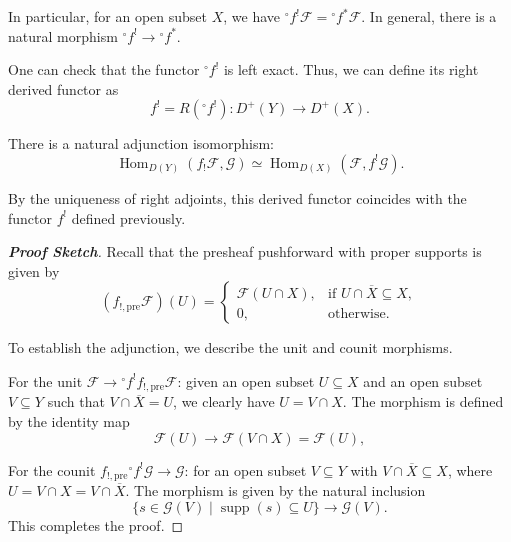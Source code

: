 In particular, for an open subset $X$, we have $^\circ f^! \mathcal{F} ={}^\circ f^* \mathcal{F}$. In general, there is a natural morphism $^\circ f^! \longrightarrow {}^\circ f^*$. 

One can check that the functor $^\circ f^!$ is left exact. Thus, we can define its right derived functor as
\begin{equation*}
    f^! = R(^\circ f^!) \colon D^+(Y) \longrightarrow D^+(X).
\end{equation*}

\begin{proposition}
There is a natural adjunction isomorphism:
\begin{equation*}
    \operatorname{Hom}_{D(Y)}(f_! \mathcal{F}, \mathcal{G}) \simeq \operatorname{Hom}_{D(X)}(\mathcal{F}, f^! \mathcal{G}).
\end{equation*}
\end{proposition}

\begin{remark}
By the uniqueness of right adjoints, this derived functor coincides with the functor $f^!$ defined previously.
\end{remark}

\begin{proof}[\textbf{Proof Sketch}]
Recall that the presheaf pushforward with proper supports is given by
\begin{equation*}
    (f_{!,\text{pre}}\mathcal{F})(U) = 
    \begin{cases} 
        \mathcal{F}(U \cap X), & \text{if } U \cap \overline{X} \subseteq X, \\
        0, & \text{otherwise}.
    \end{cases}
\end{equation*}

To establish the adjunction, we describe the unit and counit morphisms.

For the unit $\mathcal{F} \longrightarrow {}^\circ f^! f_{!,\text{pre}} \mathcal{F}$: 
given an open subset $U \subseteq X$ and an open subset $V \subseteq Y$ such that $V \cap \overline{X} = U$, 
we clearly have $U = V \cap X$. 
The morphism is defined by the identity map 
\begin{equation*}
    \mathcal{F}(U) \longrightarrow \mathcal{F}(V \cap X)=\mathcal{F}(U),
\end{equation*}

For the counit $f_{!,\text{pre}} {}^\circ f^! \mathcal{G} \longrightarrow \mathcal{G}$: 
for an open subset $V \subseteq Y$ with
 $V \cap \overline{X} \subseteq X$, 
 where $U = V \cap X = V \cap \overline{X}$. The morphism is given by the natural inclusion 
\begin{equation*}
    \{s \in \mathcal{G}(V) \mid \operatorname{supp}(s) \subseteq U\} \longrightarrow \mathcal{G}(V).
\end{equation*}
This completes the proof.
\end{proof}

